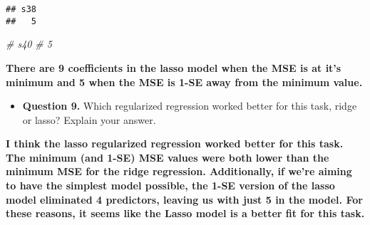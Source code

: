\documentclass[
]{article}
\newenvironment{Shaded}{\begin{snugshade}}{\end{snugshade}}
\newcommand{\CommentTok}[1]{\textcolor[rgb]{0.56,0.35,0.01}{\textit{#1}}}
\providecommand{\tightlist}{%
  \setlength{\itemsep}{0pt}\setlength{\parskip}{0pt}}
\begin{document}
\begin{verbatim}
## s38 
##   5
\end{verbatim}

\begin{Shaded}
\begin{Highlighting}[]
\CommentTok{\# s40 }
\CommentTok{\#  5}
\end{Highlighting}
\end{Shaded}

\textbf{There are 9 coefficients in the lasso model when the MSE is at
it's minimum and 5 when the MSE is 1-SE away from the minimum value.}

\begin{itemize}
\tightlist
\item
  \textbf{Question 9.} Which regularized regression worked better for
  this task, ridge or lasso? Explain your answer.
\end{itemize}

\textbf{I think the lasso regularized regression worked better for this
task. The minimum (and 1-SE) MSE values were both lower than the minimum
MSE for the ridge regression. Additionally, if we're aiming to have the
simplest model possible, the 1-SE version of the lasso model eliminated
4 predictors, leaving us with just 5 in the model. For these reasons, it
seems like the Lasso model is a better fit for this task.}
\end{document}
